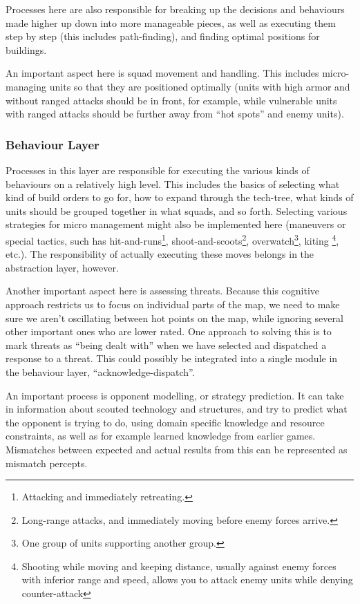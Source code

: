 Processes here are also responsible for breaking up the decisions and behaviours
made higher up down into more manageable pieces, as well as executing them step
by step (this includes path-finding), and finding optimal positions for
buildings.

An important aspect here is squad movement and handling. This includes
micro-managing units so that they are positioned optimally (units with high
armor and without ranged attacks should be in front, for example, while
vulnerable units with ranged attacks should be further away from ``hot spots''
and enemy units).

\subsubsection{Behaviour Layer}
Processes in this layer are responsible for executing the various kinds of
behaviours on a relatively high level. This includes the basics of selecting
what kind of build orders to go for, how to expand through the tech-tree, what
kinds of units should be grouped together in what squads, and so forth.
Selecting various strategies for micro management might also be implemented here
(maneuvers or special tactics, such has hit-and-runs\footnote{Attacking and
immediately retreating.}, shoot-and-scoots\footnote{Long-range attacks, and
immediately moving before enemy forces arrive.}, overwatch\footnote{One group of
units supporting another group.}, kiting \footnote{Shooting while moving and
keeping distance, usually against enemy forces with inferior range and speed,
allows you to attack enemy units while denying counter-attack}, etc.). The
responsibility of actually executing these moves belongs in the abstraction
layer, however.

Another important aspect here is assessing threats. Because this cognitive
approach restricts us to focus on individual parts of the map, we need to make
sure we aren't oscillating between hot points on the map, while ignoring
several other important ones who are lower rated. One approach to
solving this is to mark threats as ``being dealt with'' when we have selected
and dispatched a response to a threat. This could possibly be integrated into a
single module in the behaviour layer, ``acknowledge-dispatch''.

An important process is opponent modelling, or strategy prediction. It can take
in information about scouted technology and structures, and try to predict what
the opponent is trying to do, using domain specific knowledge and resource
constraints, as well as for example learned knowledge from earlier games.
Mismatches between expected and actual results from this can be represented as
mismatch percepts.

